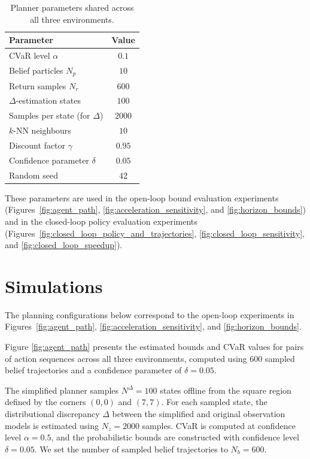 \documentclass[acmlarge, manuscript, screen, review, natbib=false, oneside]{acmart}
\begin{document}
\begin{table}[ht]
	\centering
	\small
	\setlength{\tabcolsep}{4pt}
	\begin{tabular}{|l|c|}
		\hline
		\textbf{Parameter} & \textbf{Value} \\
		\hline
		CVaR level $\alpha$ & $0.1$ \\
		\hline
		Belief particles $N_p$ & $10$ \\
		\hline
		Return samples $N_r$ & $600$ \\
		\hline
		$\Delta$-estimation states & $100$ \\
		\hline
		Samples per state (for $\Delta$) & $2000$ \\
		\hline
		$k$-NN neighbours & $10$ \\
		\hline
		Discount factor $\gamma$ & $0.95$ \\
		\hline
		Confidence parameter $\delta$ & $0.05$ \\
		\hline
		Random seed & $42$ \\
		\hline
	\end{tabular}
	\caption{Planner parameters shared across all three environments.}
	\label{tab:shared_planner_config}
\end{table}

These parameters are used in the open-loop bound evaluation experiments (Figures~\ref{fig:agent_path}, \ref{fig:acceleration_sensitivity}, and \ref{fig:horizon_bounds}) and in the closed-loop policy evaluation experiments (Figures~\ref{fig:closed_loop_policy_and_trajectories}, \ref{fig:closed_loop_sensitivity}, and \ref{fig:closed_loop_speedup}).

\section{Simulations}\label{sec:simulations_appendix}

The planning configurations below correspond to the open-loop experiments in Figures~\ref{fig:agent_path}, \ref{fig:acceleration_sensitivity}, and \ref{fig:horizon_bounds}.

Figure \ref{fig:agent_path} presents the estimated bounds and CVaR values for pairs of action sequences across all three environments, computed using 600 sampled belief trajectories and a confidence parameter of $\delta = 0.05$.

The simplified planner samples $N^\Delta = 100$ states offline from the square region defined by the corners $(0, 0)$ and $(7, 7)$. For each sampled state, the distributional discrepancy $\Delta$ between the simplified and original observation models is estimated using $N_z=2000$ samples. CVaR is computed at confidence level $\alpha = 0.5$, and the probabilistic bounds are constructed with confidence level $\delta = 0.05$. We set the number of sampled belief trajectories to $N_b=600$.
\end{document}
